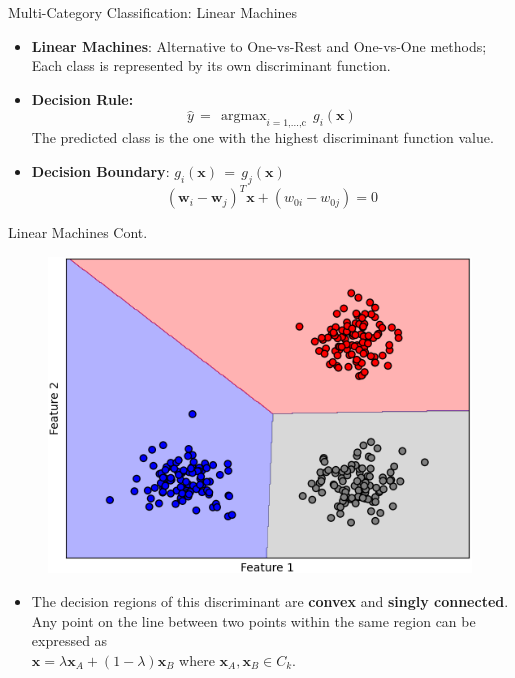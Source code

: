 \documentclass[serif, aspectratio=169]{beamer}
\DeclareMathOperator*{\argmax}{argmax}
\begin{document}
\begin{frame}{Multi-Category Classification: Linear Machines}
    \begin{itemize}\itemsep1.5em
        \item \justifying \textbf{Linear Machines}: Alternative to One-vs-Rest and One-vs-One methods; 
        Each class is represented by its own discriminant function.
        \item \justifying \textbf{Decision Rule:} 
        \[\hat{y} \, = \, \argmax_{i=\text{1,...,c}} \, g_i(\mathbf{x})\]
        The predicted class is the one with the highest discriminant function value.
        \item \textbf{Decision Boundary}:
        \(g_i(\mathbf{x}) \, = \, g_j(\mathbf{x})\)
        \[(\mathbf{w}_i - \mathbf{w}_j)^T\mathbf{x} + (w_{0i} - w_{0j}) = 0\]
    \end{itemize}
\end{frame}


\begin{frame}{Linear Machines Cont.}
    \begin{center}
            \begin{figure}
                \includegraphics[width=\textwidth]{pic/Figure_9.png}
            \end{figure}
        \endminipage
    \end{center}
    \hspace{4cm}
    \begin{itemize}\itemsep1.5em
        \item \justifying The decision regions of this discriminant are \textbf{convex} and \textbf{singly connected}. Any point on the line between two points within the same region can be expressed as \\
\(
\mathbf{x} = \lambda \mathbf{x}_A + (1 - \lambda) \mathbf{x}_B
\)
where \( \mathbf{x}_A, \mathbf{x}_B \in C_k \).

    \end{itemize}
\end{frame}
\end{document}
